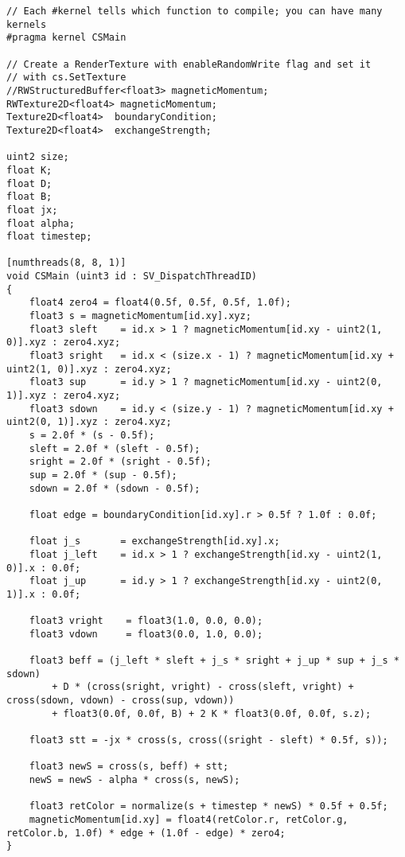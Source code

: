 \documentclass[aps,superscriptaddress,groupedaddress]{revtex4}  %
\begin{document}
\begin{lstlisting}
// Each #kernel tells which function to compile; you can have many kernels
#pragma kernel CSMain

// Create a RenderTexture with enableRandomWrite flag and set it
// with cs.SetTexture
//RWStructuredBuffer<float3> magneticMomentum;
RWTexture2D<float4> magneticMomentum;
Texture2D<float4>  boundaryCondition;
Texture2D<float4>  exchangeStrength;

uint2 size;
float K;
float D;
float B;
float jx;
float alpha;
float timestep;

[numthreads(8, 8, 1)]
void CSMain (uint3 id : SV_DispatchThreadID)
{
    float4 zero4 = float4(0.5f, 0.5f, 0.5f, 1.0f);
    float3 s = magneticMomentum[id.xy].xyz;
    float3 sleft    = id.x > 1 ? magneticMomentum[id.xy - uint2(1, 0)].xyz : zero4.xyz;
    float3 sright   = id.x < (size.x - 1) ? magneticMomentum[id.xy + uint2(1, 0)].xyz : zero4.xyz;
    float3 sup      = id.y > 1 ? magneticMomentum[id.xy - uint2(0, 1)].xyz : zero4.xyz;
    float3 sdown    = id.y < (size.y - 1) ? magneticMomentum[id.xy + uint2(0, 1)].xyz : zero4.xyz;
    s = 2.0f * (s - 0.5f);
    sleft = 2.0f * (sleft - 0.5f);
    sright = 2.0f * (sright - 0.5f);
    sup = 2.0f * (sup - 0.5f);
    sdown = 2.0f * (sdown - 0.5f);

    float edge = boundaryCondition[id.xy].r > 0.5f ? 1.0f : 0.0f;

    float j_s       = exchangeStrength[id.xy].x;
    float j_left    = id.x > 1 ? exchangeStrength[id.xy - uint2(1, 0)].x : 0.0f;
    float j_up      = id.y > 1 ? exchangeStrength[id.xy - uint2(0, 1)].x : 0.0f;

    float3 vright    = float3(1.0, 0.0, 0.0);
    float3 vdown     = float3(0.0, 1.0, 0.0);

    float3 beff = (j_left * sleft + j_s * sright + j_up * sup + j_s * sdown)
        + D * (cross(sright, vright) - cross(sleft, vright) + cross(sdown, vdown) - cross(sup, vdown))
        + float3(0.0f, 0.0f, B) + 2 K * float3(0.0f, 0.0f, s.z);

    float3 stt = -jx * cross(s, cross((sright - sleft) * 0.5f, s));

    float3 newS = cross(s, beff) + stt;
    newS = newS - alpha * cross(s, newS);

    float3 retColor = normalize(s + timestep * newS) * 0.5f + 0.5f;
    magneticMomentum[id.xy] = float4(retColor.r, retColor.g, retColor.b, 1.0f) * edge + (1.0f - edge) * zero4;
}
\end{lstlisting}
\end{document}
